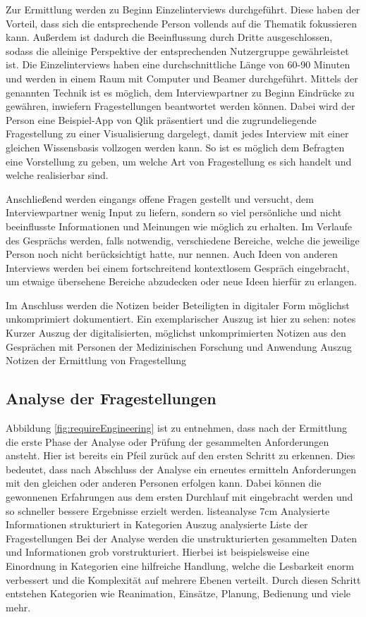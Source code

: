 Zur Ermittlung werden zu Beginn Einzelinterviews durchgeführt. 
Diese haben der Vorteil, dass sich die entsprechende Person vollends auf die Thematik fokussieren kann.
Außerdem ist dadurch die Beeinflussung durch Dritte ausgeschlossen, sodass die alleinige Perspektive der entsprechenden Nutzergruppe gewährleistet ist.
Die Einzelinterviews haben eine durchschnittliche Länge von 60-90 Minuten und werden in einem Raum mit Computer und Beamer durchgeführt.
Mittels der genannten Technik ist es möglich, dem Interviewpartner zu Beginn Eindrücke zu gewähren, inwiefern Fragestellungen beantwortet werden können.
Dabei wird der Person eine Beispiel-App von Qlik präsentiert und die zugrundeliegende Fragestellung zu einer Visualisierung dargelegt, damit jedes Interview mit einer gleichen Wissensbasis vollzogen werden kann.
So ist es möglich dem Befragten eine Vorstellung zu geben, um welche Art von Fragestellung es sich handelt und welche realisierbar sind.

Anschließend werden eingangs offene Fragen gestellt und versucht, dem Interviewpartner wenig Input zu liefern, sondern so viel persönliche und nicht beeinflusste Informationen und Meinungen wie möglich zu erhalten.
Im Verlaufe des Gesprächs werden, falls notwendig, verschiedene Bereiche, welche die jeweilige Person noch nicht berücksichtigt hatte, nur nennen.
Auch Ideen von anderen Interviews werden bei einem fortschreitend kontextlosem Gespräch eingebracht, um etwaige übersehene Bereiche abzudecken oder neue Ideen hierfür zu erlangen. 

Im Anschluss werden die Notizen beider Beteiligten in digitaler Form möglichst unkomprimiert dokumentiert.
Ein exemplarischer Auszug ist hier zu sehen: 
\bildbreit
{notes}
{Kurzer Auszug der digitalisierten, möglichst unkomprimierten Notizen aus den Gesprächen mit Personen der \glqq Medizinischen Forschung und Anwendung\grqq}
{Auszug Notizen der Ermittlung von Fragestellung}



\subsection{Analyse der Fragestellungen}
\label{sub:analyseFragen}
Abbildung \ref{fig:requireEngineering} ist zu entnehmen, dass nach der Ermittlung die erste Phase der Analyse oder Prüfung der gesammelten Anforderungen ansteht.
Hier ist bereits ein Pfeil zurück auf den ersten Schritt zu erkennen.
Dies bedeutet, dass nach Abschluss der Analyse ein erneutes ermitteln Anforderungen mit den gleichen oder anderen Personen erfolgen kann.
Dabei können die gewonnenen Erfahrungen aus dem ersten Durchlauf mit eingebracht werden und so schneller bessere Ergebnisse erzielt werden.
\bildrechts
{listeanalyse}
{7cm}
{Analysierte Informationen strukturiert in Kategorien}
{Auszug analysierte Liste der Fragestellungen}
Bei der Analyse werden die unstrukturierten gesammelten Daten und Informationen grob vorstrukturiert.
Hierbei ist beispielsweise eine Einordnung in Kategorien eine hilfreiche Handlung, welche die Lesbarkeit enorm verbessert und die Komplexität auf mehrere Ebenen verteilt.
Durch diesen Schritt entstehen Kategorien wie Reanimation, Einsätze, Planung, Bedienung und viele mehr.

